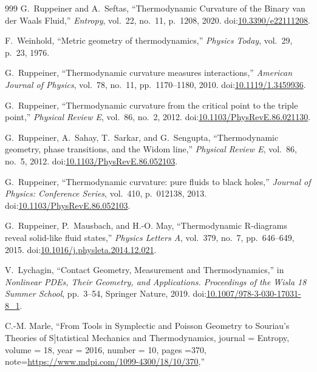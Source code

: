 \documentclass[10pt,a4paper]{article}
\begin{document}
\begin{thebibliography}{999}
G.~Ruppeiner and A.~Seftas, ``Thermodynamic {C}urvature of the {B}inary van der
  {W}aals {F}luid,'' {\em Entropy}, vol.~22, no.~11, p.~1208, 2020.
\newblock doi:\href{https://doi.org/10.3390/e22111208}{10.3390/e22111208}.

F.~Weinhold, ``Metric geometry of thermodynamics,'' {\em Physics Today},
  vol.~29, p.~23, 1976.

G.~Ruppeiner, ``Thermodynamic curvature measures interactions,'' {\em American
  Journal of Physics}, vol.~78, no.~11, pp.~1170--1180, 2010.
\newblock doi:\href{https://doi.org/10.1119/1.3459936}{10.1119/1.3459936}.

G.~Ruppeiner, ``Thermodynamic curvature from the critical point to the triple
  point,'' {\em Physical Review E}, vol.~86, no.~2, 2012.
\newblock
  doi:\href{https://doi.org/10.1103/PhysRevE.86.021130}{10.1103/PhysRevE.86.021130}.

G.~Ruppeiner, A.~Sahay, T.~Sarkar, and G.~Sengupta, ``Thermodynamic geometry,
  phase transitions, and the {W}idom line,'' {\em Physical Review E}, vol.~86,
  no.~5, 2012.
\newblock
  doi:\href{https://doi.org/10.1103/PhysRevE.86.052103}{10.1103/PhysRevE.86.052103}.

G.~Ruppeiner, ``Thermodynamic curvature: pure fluids to black holes,'' {\em
  Journal of Physics: Conference Series}, vol.~410, p.~012138, 2013.
\newblock
  doi:\href{https://doi.org/10.1103/PhysRevE.86.052103}{10.1103/PhysRevE.86.052103}.

G.~Ruppeiner, P.~Mausbach, and H.-O. May, ``Thermodynamic {R}-diagrams reveal
  solid-like fluid states,'' {\em Physics Letters A}, vol.~379, no.~7,
  pp.~646--649, 2015.
\newblock
  doi:\href{https://doi.org/10.1016/j.physleta.2014.12.021}{10.1016/j.physleta.2014.12.021}.

V.~Lychagin, ``{C}ontact {G}eometry, {M}easurement and {T}hermodynamics,'' in
  {\em Nonlinear PDEs, Their Geometry, and Applications. Proceedings of the
  Wisla 18 Summer School}, pp.~3--54, Springer Nature, 2019.
\newblock
  doi:\href{https://doi.org/10.1007/978-3-030-17031-8_1}{10.1007/978-3-030-17031-8\_1}.

C.-M. {M}arle, ``{F}rom {T}ools in {S}ymplectic and {P}oisson {G}eometry to
  {S}ouriau’s {T}heories of {S]tatistical {M}echanics and {T}hermodynamics},
  journal = {Entropy}, volume = {18}, year = {2016}, number = {10}, pages
  ={370}, note={\url{https://www.mdpi.com/1099-4300/18/10/370}},''


\end{thebibliography}
\end{document}

